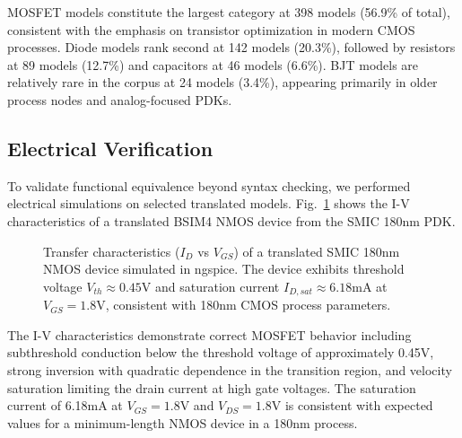 \documentclass[conference]{IEEEtran}
\begin{document}
MOSFET models constitute the largest category at 398 models (56.9\% of total), consistent with the emphasis on transistor optimization in modern CMOS processes. Diode models rank second at 142 models (20.3\%), followed by resistors at 89 models (12.7\%) and capacitors at 46 models (6.6\%). BJT models are relatively rare in the corpus at 24 models (3.4\%), appearing primarily in older process nodes and analog-focused PDKs.

\subsection{Electrical Verification}

To validate functional equivalence beyond syntax checking, we performed electrical simulations on selected translated models. Fig.~\ref{fig:iv_curve} shows the I-V characteristics of a translated BSIM4 NMOS device from the SMIC 180nm PDK.

\begin{figure}[htbp]
\centering
{}
\caption{Transfer characteristics ($I_D$ vs $V_{GS}$) of a translated SMIC 180nm NMOS device simulated in ngspice. The device exhibits threshold voltage $V_{th} \approx 0.45$V and saturation current $I_{D,sat} \approx 6.18$mA at $V_{GS} = 1.8$V, consistent with 180nm CMOS process parameters.}
\label{fig:iv_curve}
\end{figure}

The I-V characteristics demonstrate correct MOSFET behavior including subthreshold conduction below the threshold voltage of approximately 0.45V, strong inversion with quadratic dependence in the transition region, and velocity saturation limiting the drain current at high gate voltages. The saturation current of 6.18mA at $V_{GS} = 1.8$V and $V_{DS} = 1.8$V is consistent with expected values for a minimum-length NMOS device in a 180nm process.
\end{document}
